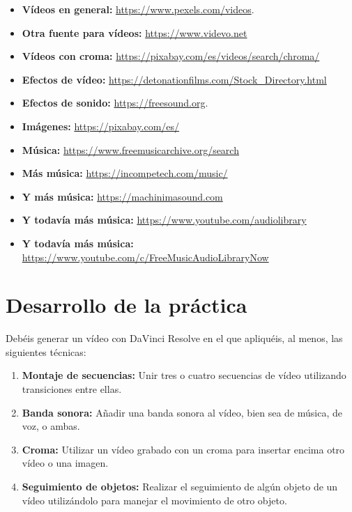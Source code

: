 \documentclass[es,practica]{uah}
\begin{document}
\begin{itemize}
	\item {\bf Vídeos en general:} \url{https://www.pexels.com/videos}.
	\item {\bf Otra fuente para vídeos:} \url{https://www.videvo.net}
	\item {\bf Vídeos con croma:} \url{https://pixabay.com/es/videos/search/chroma/}
	\item {\bf Efectos de vídeo:} \url{https://detonationfilms.com/Stock_Directory.html} 
	\item {\bf Efectos de sonido:} \url{https://freesound.org}.
	\item {\bf Imágenes:} \url{https://pixabay.com/es/}
	\item {\bf Música:} \url{https://www.freemusicarchive.org/search}
	\item {\bf Más música:} \url{https://incompetech.com/music/}
	\item {\bf Y más música:} \url{https://machinimasound.com}
	\item {\bf Y todavía más música:} \url{https://www.youtube.com/audiolibrary}
	\item {\bf Y todavía más música:} \url{https://www.youtube.com/c/FreeMusicAudioLibraryNow}
\end{itemize}
 


\section{Desarrollo de la práctica}

Debéis generar un vídeo con DaVinci Resolve en el que apliquéis, al menos, las siguientes técnicas:

\begin{enumerate}
	\item {\bf Montaje de secuencias: }Unir tres o cuatro secuencias de vídeo utilizando transiciones entre ellas. 
	\item {\bf Banda sonora: } Añadir una banda sonora al vídeo, bien sea de música, de voz, o ambas. 
	\item {\bf Croma: }Utilizar un vídeo grabado con un croma para insertar encima otro vídeo o una imagen. 
	\item {\bf Seguimiento de objetos: } Realizar el seguimiento de algún objeto de un vídeo utilizándolo para manejar el movimiento de otro objeto. 

\end{enumerate}
\end{document}
